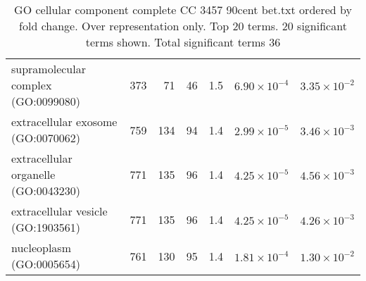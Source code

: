\begin{table}[ht]
\begin{adjustbox}{width=\textwidth}
\begin{tabular}{lrrrrrr}
  supramolecular complex (GO:0099080) & 373 & 71 & 46 & 1.5 & $6.90 \times 10^{-4}$ & $3.35 \times 10^{-2}$ \\ 
  extracellular exosome (GO:0070062) & 759 & 134 & 94 & 1.4 & $2.99 \times 10^{-5}$ & $3.46 \times 10^{-3}$ \\ 
  extracellular organelle (GO:0043230) & 771 & 135 & 96 & 1.4 & $4.25 \times 10^{-5}$ & $4.56 \times 10^{-3}$ \\ 
  extracellular vesicle (GO:1903561) & 771 & 135 & 96 & 1.4 & $4.25 \times 10^{-5}$ & $4.26 \times 10^{-3}$ \\ 
  nucleoplasm (GO:0005654) & 761 & 130 & 95 & 1.4 & $1.81 \times 10^{-4}$ & $1.30 \times 10^{-2}$ \\ 
   \hline
\end{tabular}
\end{adjustbox}
\caption{GO cellular component complete CC 3457 90cent bet.txt ordered by fold change. Over representation only. Top 20 terms. 20 significant terms shown. Total significant terms 36} 
\label{tab:GO cellular component complete CC 3457 90cent bet.txt ordered by fold change. Over representation only. Top 20 terms. 20 significant terms shown. Total significant terms 36}
\end{table}


